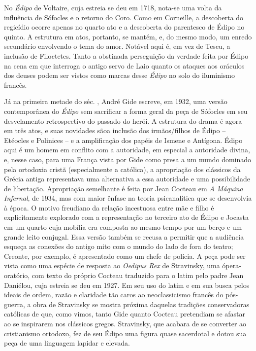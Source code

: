 No \emph{Édipo} de Voltaire, cuja estreia se deu em 1718,
nota-se uma volta da influência de Sófocles e o retorno do Coro. Como em
Corneille, a descoberta do regicídio ocorre apenas no quarto ato e a
descoberta do parentesco de Édipo no quinto. A estrutura em atos,
portanto, se mantém, e, do mesmo modo, um enredo secundário envolvendo o
tema do amor. Notável aqui é, em vez de Teseu, a inclusão de Filoctetes.
Tanto a obstinada perseguição da verdade feita por Édipo na cena em que
interroga o antigo servo de Laio quanto os ataques aos oráculos dos
deuses podem ser vistos como marcas desse \emph{Édipo} no solo do
iluminismo francês.

Já na primeira metade do séc. , André Gide escreve, em 1932,
uma versão contemporânea do \emph{Édipo} sem sacrificar a forma geral da
peça de Sófocles em seu desvelamento retrospectivo do passado do herói.
A estrutura do drama é agora em três atos, e suas novidades são\quad a
inclusão dos irmãos/filhos de Édipo -- Etéocles e Polinices -- e a
amplificação dos papéis de Ismene e Antígona. Édipo aqui é um homem em
conflito com a autoridade, em especial a autoridade divina, e, nesse
caso, para uma França vista por Gide como presa a um mundo dominado pela
ortodoxia cristã (especialmente a católica), a apropriação dos clássicos
da Grécia antiga representava uma alternativa a essa autoridade e uma
possibilidade de libertação. Apropriação semelhante é feita por
Jean Cocteau em \emph{A Máquina Infernal}, de 1934, mas com
maior ênfase na teoria psicanalítica que se desenvolvia à época. O
motivo freudiano da relação incestuosa entre mãe e filho é
explicitamente explorado com a representação no terceiro ato de Édipo e
Jocasta em um quarto cuja mobília era composta ao mesmo tempo por um
berço e um grande leito conjugal. Essa versão também se recusa a
permitir que a audiência esqueça as conexões do antigo mito com o mundo
do lado de fora do teatro; Creonte, por exemplo, é apresentado como um
chefe de polícia. A peça pode ser vista como uma espécie de resposta ao
\emph{Oedipus Rex} de Stravinsky, uma ópera-oratório, com texto
do próprio Cocteau traduzido para o latim pelo padre Jean Daniélou, cuja
estreia se deu em 1927. Em seu uso do latim e em sua busca pelos ideais
de ordem, razão e claridade tão caros ao neoclassicismo francês do
pós-guerra, a obra de Stravinsky se mostra próxima daquelas tradições
conservadoras católicas de que, como vimos, tanto Gide quanto Cocteau
pretendiam se afastar ao se inspirarem nos clássicos gregos. Stravinsky,
que acabara de se converter ao cristianismo ortodoxo, fez de seu Édipo
uma figura quase sacerdotal e dotou sua peça de uma linguagem lapidar e
elevada.

